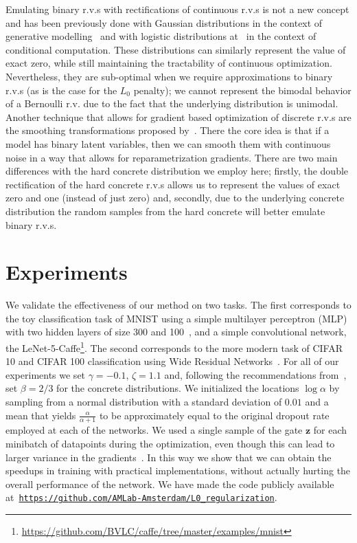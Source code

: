 \documentclass{article} %
\def\*#1{\mathbf{#1}}
\begin{document}
Emulating binary r.v.s with rectifications of continuous r.v.s is not a new concept and has been previously done with Gaussian distributions in the context of generative modelling~\citep{hinton1997generative,harva2007variational, salimans2016structured} and with logistic distributions at~\citep{bengio2013estimating} in the context of conditional computation. These distributions can similarly represent the value of exact zero, while still maintaining the tractability of continuous optimization. Nevertheless, they are sub-optimal when we require approximations to binary r.v.s (as is the case for the $L_0$ penalty); we cannot represent the bimodal behavior of a Bernoulli r.v. due to the fact that the underlying distribution is unimodal. Another technique that allows for gradient based optimization of discrete r.v.s are the smoothing transformations proposed by~\cite{rolfe2016discrete}. There the core idea is that if a model has binary latent variables, then we can smooth them with continuous noise in a way that allows for reparametrization gradients. There are two main differences with the hard concrete distribution we employ here; firstly, the double rectification of the hard concrete r.v.s allows us to represent the values of exact zero and one (instead of just zero) and, secondly, due to the underlying concrete distribution the random samples from the hard concrete will better emulate binary r.v.s.

\section{Experiments}

We validate the effectiveness of our method on two tasks. The first corresponds to the toy classification task of MNIST using a simple multilayer perceptron (MLP) with two hidden layers of size 300 and 100~\citep{lecun1998gradient}, and a simple convolutional network, the LeNet-5-Caffe\footnote{\url{https://github.com/BVLC/caffe/tree/master/examples/mnist}}. The second corresponds to the more modern task of CIFAR 10 and CIFAR 100 classification using Wide Residual Networks~\citep{zagoruyko2016wide}. For all of our experiments we set $\gamma = -0.1$, $\zeta = 1.1$ and, following the recommendations from~\cite{maddison2016concrete}, set $\beta = 2/3$ for the concrete distributions. We initialized the locations $\log\alpha$ by sampling from a normal distribution with a standard deviation of $0.01$ and a mean that yields $\frac{\alpha}{\alpha + 1}$ to be approximately equal to the original dropout rate employed at each of the networks. We used a single sample of the gate $\*z$ for each minibatch of datapoints during the optimization, even though this can lead to larger variance in the gradients~\citep{kingma2015variational}. In this way we show that we can obtain the speedups in training with practical implementations, without actually hurting the overall performance of the network. We have made the code publicly available at~\href{https://github.com/AMLab-Amsterdam/L0_regularization}{\texttt{https://github.com/AMLab-Amsterdam/L0\_regularization}}.
\end{document}
